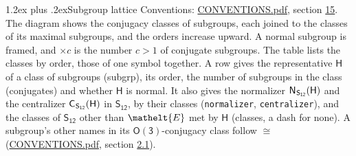 \documentclass[10pt,a4paper]{article}
\makeatletter
\renewcommand\section{\@startsection{section}{1}{\z@}{-3ex plus -1ex minus -.2ex}%
  {1.2ex plus .2ex}{\normalfont\large\sffamily\bfseries\color{parttitle}}}
\numberwithin{equation}{section}
\newcommand{\eltfont}[1]{{\let\sigma\eltsigma\mathelt{#1}}}
\newcommand{\grp}[1]{\mathsf{#1}}
\newcommand{\cls}[1]{\eltfont{#1}}
\newcommand{\samecls}{\cong}
\newcommand{\hairsp}{\mkern1mu}
\makeatother
\begin{document}
\section{Subgroup lattice}\label{s:subgroups}
Conventions: \href{../../CONVENTIONS.pdf}{CONVENTIONS.pdf}, section \href{../../CONVENTIONS.pdf\#conv.15}{15}.
The diagram shows the conjugacy classes of subgroups, each joined to the classes of its maximal subgroups, and the orders increase upward. \label{n:index.conjugates.c}A normal subgroup is framed, and ${\times}c$ is the number $c > 1$ of conjugate subgroups. The table lists the classes by order, those of one symbol together. \label{n:group.H}\label{n:head.subgroup}\label{n:head.order}\label{n:head.conjugates}\label{n:head.normal}A row gives the representative $\grp{H}$ of a class of subgroups (subgrp), its order, the number of subgroups in the class (conjugates) and whether $\grp{H}$ is normal. \label{n:group.normalizer}\label{n:group.centralizer}\label{n:head.classes}It also gives the normalizer $\grp{N}_{\hairsp \grp{S_{12}}}(\grp{H})$ and the centralizer $\grp{C}_{\hairsp \grp{S_{12}}}(\grp{H})$ in $\grp{S_{12}}$, by their classes (\texttt{normalizer}, \texttt{centralizer}), and the classes of $\grp{S_{12}}$ other than $\cls{E}$ met by $\grp{H}$ (classes, a dash for none). A subgroup's other names in its \href{O3.pdf}{$\grp{O(3)}$}-conjugacy class follow $\samecls$ (\href{../../CONVENTIONS.pdf}{CONVENTIONS.pdf}, section \href{../../CONVENTIONS.pdf\#conv.2.1}{2.1}).
\begin{center}
\end{center}
\end{document}
